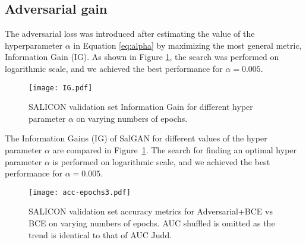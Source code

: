 \documentclass[times,twocolumn,final,authoryear]{elsarticle}
\begin{document}

\subsection{Adversarial gain}

The adversarial loss was introduced after estimating the value of the hyperparameter $\alpha$ in Equation \ref{eq:alpha} by maximizing the most general metric, Information Gain (IG).  As shown in Figure \ref{fig:alpha}, the search was performed on logarithmic scale, and we achieved the best performance for $\alpha=0.005$. %

\begin{figure}[ht]
\centering
\texttt{[image: IG.pdf]}
\caption{SALICON validation set Information Gain for different hyper parameter $\alpha$ on varying numbers of epochs.}
\label{fig:alpha}
\end{figure}


The Information Gains (IG) of SalGAN  for different values of the hyper parameter $\alpha$ are compared in Figure~\ref{fig:alpha}. The search for finding an optimal hyper parameter $\alpha$ is performed on logarithmic scale, and we achieved the best performance for $\alpha=0.005$.



\begin{figure}
\centering
\texttt{[image: acc-epochs3.pdf]}
\caption{SALICON validation set accuracy metrics for Adversarial+BCE vs BCE on varying numbers of epochs. AUC shuffled is omitted as the trend is identical to that of AUC Judd.\vspace*{-4mm}}
\label{fig:ganvsbce}
\end{figure}
\end{document}
